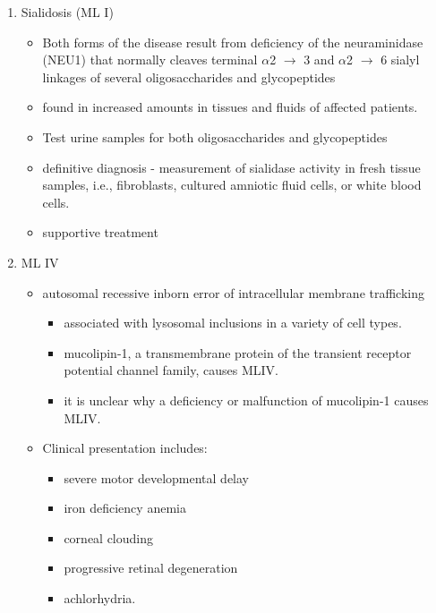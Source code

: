 \documentclass{scrartcl}
\begin{document}
\begin{enumerate}
\item Sialidosis (ML I)
\label{sec:org1568b6e}

\begin{itemize}
\item Both forms of the disease result from deficiency of the
neuraminidase (NEU1) that normally cleaves terminal \(\alpha\)2 \(\to\) 3 and
\(\alpha\)2 \(\to\) 6 sialyl linkages of several oligosaccharides and glycopeptides

\item found in increased amounts in tissues and fluids of affected patients.

\item Test urine samples for both oligosaccharides and glycopeptides

\item definitive diagnosis - measurement of sialidase activity in fresh tissue
samples, i.e., fibroblasts, cultured amniotic fluid cells, or white
blood cells.

\item supportive treatment
\end{itemize}

\item ML IV
\label{sec:org8b43017}

\begin{itemize}
\item autosomal recessive inborn error of intracellular membrane trafficking
\begin{itemize}
\item associated with lysosomal inclusions in a variety of cell types.
\item mucolipin-1, a transmembrane protein of the transient receptor
potential channel family, causes MLIV.
\item it is unclear why a deficiency or malfunction of mucolipin-1 causes MLIV.
\end{itemize}

\item Clinical presentation includes:
\begin{itemize}
\item severe motor developmental delay
\item iron deficiency anemia
\item corneal clouding
\item progressive retinal degeneration
\item achlorhydria.
\end{itemize}


\end{itemize}
\end{enumerate}
\end{document}

